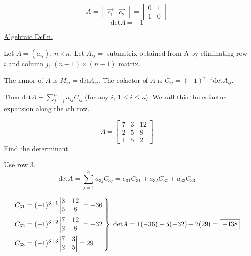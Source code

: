 \documentclass[../main.tex]{subfiles}
\begin{document}
\begin{example}[]
    \[ A = \begin{bmatrix}
        \vec{c_1} & \vec{c_2}
    \end{bmatrix} = \begin{bmatrix}
        0 & 1 \\
        1 & 0
    \end{bmatrix} \]
    \[ \text{det}A = -1 \]

\end{example}

\underline{Algebraic Def'n.}

Let \( A = \left( a_{ij} \right), \, n \times n\).
Let \( A_{ij} = \) submatrix obtained from A by eliminating row \( i \) and column \( j, \, (n-1) \times (n-1) \) matrix.

The minor of \( A \) is \( M_{ij} = \text{det}A_{ij}\).
The cofactor of \( A \) is \( C_{ij} = (-1)^{i+j}\text{det}A_{ij}\).

Then \( \text{det}A = \sum_{j=1}^{n}a_{ij}C_{ij} \) (for any \( i, \, 1 \leq i \leq n \)).
We call this the cofactor expansion along the \( i \)th row.

\begin{example}[]
    \[ A = \begin{bmatrix}
        7 & 3 & 12 \\
        2 & 5 & 8 \\
        1 & 5 & 2
    \end{bmatrix} \]
    Find the determinant.

    Use row 3.
    \[ \text{det}A = \sum_{j=1}^{3} a_{3j} C_{3j} = a_{31}C_{31} + a_{32}C_{32} + a_{33}C_{33} \]

    \[ \left.\kern-\nulldelimiterspace
        \begin{aligned}
            C_{31} &= (-1)^{3+1} \begin{vmatrix} 3 & 12 \\ 5 & 8 \end{vmatrix} = -36 \\
            C_{32} &= (-1)^{3+2} \begin{vmatrix} 7 & 12 \\ 2 & 8 \end{vmatrix} = -32 \\
            C_{33} &= (-1)^{3+3} \begin{vmatrix} 7 & 3 \\ 2 & 5 \end{vmatrix} = 29
        \end{aligned} \; \right\} \;
        \text{det}A = 1(-36)+5(-32)+2(29) = \boxed{-138}
    \]
\end{example}
\end{document}
